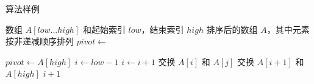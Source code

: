 \begin{algorithm}[H]
  \caption{\label{alg:sample}算法样例}
  \begin{algorithmic}[1] %
    \Require 数组 $A[low...high]$ 和起始索引 $low$，结束索引 $high$ %
    \Ensure 排序后的数组 $A$，其中元素按非递减顺序排列 %
        \State $pivot \gets$  %
        \State {}
        \State {}
      \EndIf
    \EndFunction
    
    \Statex
    
      \State $pivot \gets A[high]$  
      \State $i \gets low-1$  
          \State $i \gets i+1$
          \State 交换 $A[i]$ 和 $A[j]$
        \EndIf
      \EndFor
      \State 交换 $A[i+1]$ 和 $A[high]$
      \State \Return $i+1$ %
    \EndFunction
  \end{algorithmic}
\end{algorithm}
